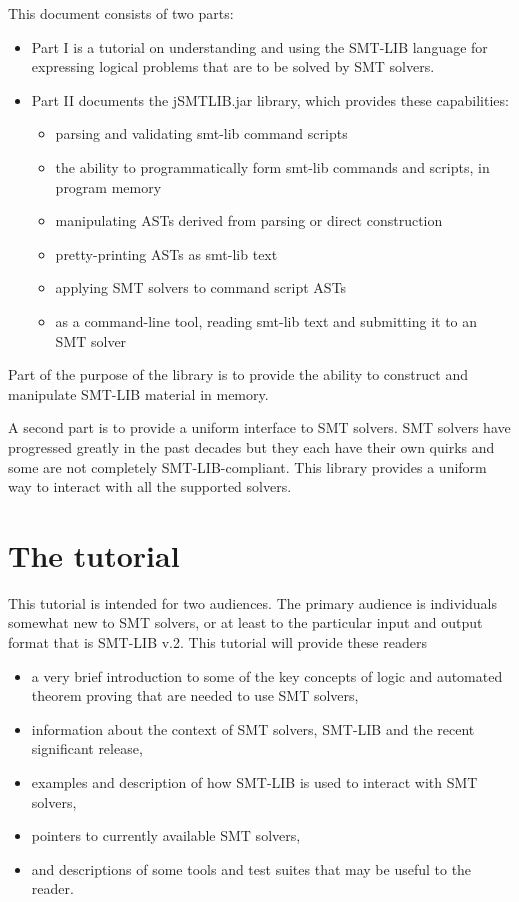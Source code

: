 \documentclass[12pt,oneside]{report}
\begin{document}
This document consists of two parts:
\begin{itemize}
\item Part I is a tutorial on understanding and using the SMT-LIB language for expressing logical problems that are to be solved by SMT solvers.
\item Part II documents the jSMTLIB.jar library, which provides these capabilities:
\begin{itemize}
\item parsing and validating smt-lib command scripts
\item the ability to programmatically form smt-lib commands and scripts,  in program memory
\item manipulating ASTs derived from parsing or direct construction
\item pretty-printing ASTs as smt-lib text
\item applying SMT solvers to command script ASTs
\item as a command-line tool,  reading smt-lib text and submitting it to an SMT solver
\end{itemize}
\end{itemize}

Part of the purpose of the library is to provide the ability to construct and manipulate SMT-LIB material in memory.

A second part is to provide a uniform interface to SMT solvers.  SMT solvers have progressed greatly in the past decades but they each have their own quirks and some are not completely SMT-LIB-compliant.  This library provides a uniform way to interact with all the supported solvers.

\section{The tutorial}


This tutorial is intended for two audiences.  The primary audience is individuals somewhat new to SMT solvers, or at least to the particular input and output format that is SMT-LIB v.2. 
This tutorial will provide these readers
\begin{itemize}
\item a very brief introduction to some of the key concepts of logic and automated theorem proving that are needed to use SMT solvers,
\item information about the context of SMT solvers, SMT-LIB and the recent significant release,
\item examples and description of how SMT-LIB is used to interact with SMT solvers,
\item pointers to currently available SMT solvers,
\item and descriptions of some tools and test suites that may be useful to the reader.
\end{itemize}
\end{document}
